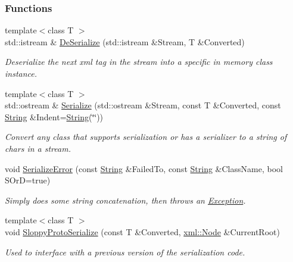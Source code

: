 \subsubsection*{Functions}
\begin{DoxyCompactItemize}
\item 
{\footnotesize template$<$class T $>$ }\\std::istream \& \hyperlink{namespacephys_adbc8714ac6e9a549a5ef261d1bda1505}{DeSerialize} (std::istream \&Stream, T \&Converted)
\begin{DoxyCompactList}\small\item\em Deserialize the next xml tag in the stream into a specific in memory class instance. \item\end{DoxyCompactList}\item 
{\footnotesize template$<$class T $>$ }\\std::ostream \& \hyperlink{namespacephys_aca0ab1969773dbd0d8799bdd6a5cb745}{Serialize} (std::ostream \&Stream, const T \&Converted, const \hyperlink{namespacephys_aa03900411993de7fbfec4789bc1d392e}{String} \&Indent=\hyperlink{namespacephys_aa03900411993de7fbfec4789bc1d392e}{String}(\char`\"{}\char`\"{}))
\begin{DoxyCompactList}\small\item\em Convert any class that supports serialization or has a serializer to a string of chars in a stream. \item\end{DoxyCompactList}\item 
void \hyperlink{namespacephys_a3d75403c50afb8ed658bb9f22a70939f}{SerializeError} (const \hyperlink{namespacephys_aa03900411993de7fbfec4789bc1d392e}{String} \&FailedTo, const \hyperlink{namespacephys_aa03900411993de7fbfec4789bc1d392e}{String} \&ClassName, bool SOrD=true)
\begin{DoxyCompactList}\small\item\em Simply does some string concatenation, then throws an \hyperlink{classphys_1_1Exception}{Exception}. \item\end{DoxyCompactList}\item 
{\footnotesize template$<$class T $>$ }\\void \hyperlink{namespacephys_a0486c9d6d2e192963225155a6ba40506}{SloppyProtoSerialize} (const T \&Converted, \hyperlink{classphys_1_1xml_1_1Node}{xml::Node} \&CurrentRoot)
\begin{DoxyCompactList}\small\item\em Used to interface with a previous version of the serialization code. \item\end{DoxyCompactList}\item 

\end{DoxyCompactItemize}
